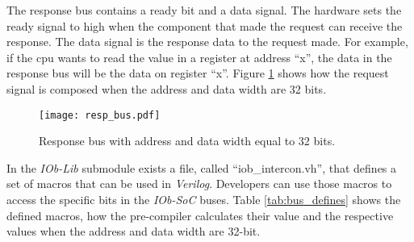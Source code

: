 The response bus contains a ready bit and a data signal. The hardware sets the ready signal to high when the component that made the request can receive the response. The data signal is the response data to the request made. For example, if the \acrshort{cpu} wants to read the value in a register at address \enquote{x}, the data in the response bus will be the data on register \enquote{x}. Figure \ref{fig:resp_bus} shows how the request signal is composed when the address and data width are 32 bits.

\begin{figure}[!h]
    \centering
    \texttt{[image: resp\_bus.pdf]}
    \caption{Response bus with address and data width equal to 32 bits.}
    \label{fig:resp_bus}
\end{figure}

In the \textit{IOb-Lib} submodule exists a file, called \enquote{iob\_intercon.vh}, that defines a set of macros that can be used in \textit{Verilog}. Developers can use those macros to access the specific bits in the \textit{IOb-SoC} buses. Table \ref{tab:bus_defines} shows the defined macros, how the pre-compiler calculates their value and the respective values when the address and data width are 32-bit.

